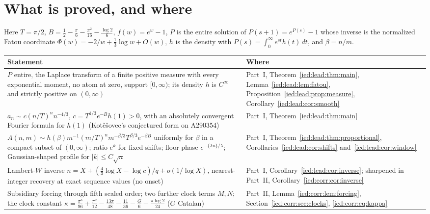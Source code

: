 \documentclass[11pt,letterpaper]{article}
\theoremstyle{remark}\newtheorem{remark}[theorem]{Remark}
\begin{document}
\section*{What is proved, and where}\label{ied:sec:status}
Here $T=\pi/2$, $B=\frac12-\frac\pi6-\frac{\pi^2}{16}-\frac{\log2}6$, $f(w)=e^w-1$, $P$ is the entire solution of $P(s+1)=e^{P(s)}-1$ whose inverse is the normalized Fatou coordinate $\Phi(w)=-2/w+\frac13\log w+O(w)$, $h$ is the density with $P(s)=\int_0^\infty e^{st}h(t)\,dt$, and $\beta=n/m$.
\begingroup\small
\renewcommand{\theHtable}{ied-status.\arabic{table}}%
\begin{longtable}{@{}>{\raggedright\arraybackslash}p{} >{\raggedright\arraybackslash}p{}@{}}
\toprule
Statement & Where\\
\midrule
\endhead
$P$ entire, the Laplace transform of a finite positive measure with every exponential moment, no atom at zero, support $[0,\infty)$; its density $h$ is $C^\infty$ and strictly positive on $(0,\infty)$ & Part~I, Theorem~\ref{ied:lead:thm:main}, Lemma~\ref{ied:lead:lem:fatou}, Proposition~\ref{ied:lead:prop:measure}, Corollary~\ref{ied:lead:cor:smooth}\\
$a_n\sim c(n/T)^nn^{-4/3}$, $c=T^{1/3}e^{-B}h(1)>0$, with an absolutely convergent Fourier formula for $h(1)$ (Kot\v{e}\v{s}ovec's conjectured form on A290354) & Part~I, Theorem~\ref{ied:lead:thm:main}\\
$A(n,m)\sim h(\beta)m^{-1}(m/T)^nm^{-\beta/3}T^{\beta/3}e^{-\beta B}$ uniformly for $\beta$ in a compact subset of $(0,\infty)$; ratio $e^k$ for fixed shifts; floor phase $e^{-\{\lambda n\}/\lambda}$; Gaussian-shaped profile for $|k|\le C\sqrt n$ & Part~I, Theorem~\ref{ied:lead:thm:proportional}, Corollaries~\ref{ied:lead:cor:shifts} and~\ref{ied:lead:cor:window}\\
Lambert-$W$ inverse $n=X+(\frac43\log X-\log c)/q+o(1/\log X)$, nearest-integer recovery at exact sequence values (no onset) & Part~I, Corollary~\ref{ied:lead:cor:inverse}; sharpened in Part~II, Corollary~\ref{ied:corr:cor:inverse}\\
Subsidiary forcing through fifth scaled order; two further clock terms $M,N$; the clock constant $\kappa=\frac{\pi^3}{96}+\frac{\pi^2}{12}-\frac{13\pi}{48}-\frac{11}{36}-\frac G6-\frac{\pi\log2}{24}$ ($G$ Catalan) & Part~II, Lemma~\ref{ied:corr:lem:forcing}, Section~\ref{ied:corr:sec:clocks}, \eqref{ied:corr:eq:kappa}\\

\end{longtable}
\end{document}
